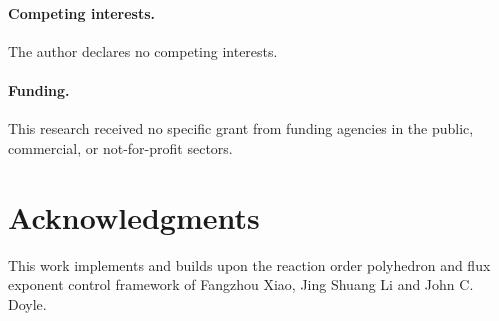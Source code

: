 \documentclass[11pt]{article}
\begin{document}
\paragraph{Competing interests.} The author declares no competing interests.

\paragraph{Funding.} This research received no specific grant from funding
agencies in the public, commercial, or not-for-profit sectors.

\section*{Acknowledgments}

This work implements and builds upon the reaction order polyhedron and flux
exponent control framework of Fangzhou Xiao, Jing Shuang Li and John C. Doyle.



\end{document}
